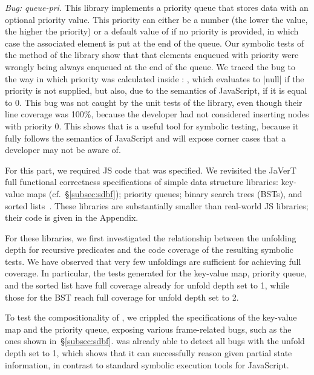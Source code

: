 \vspace*{0.3em}
\noindent \emph{Bug: queue-pri.} This library implements a priority queue that stores data with an optional priority value.
This priority can either be a number (the lower the value, the higher the priority) or a default value of  if no priority is provided, in which case the associated element is put at the end of the queue.
Our symbolic tests of the  method of the library show that that elements enqueued with priority  were wrongly being always enqueued at the end of the queue. We traced the bug to the way in which priority was calculated inside : , which evaluates to \jsinline|null| if the priority is not supplied, but also, due to the semantics of JavaScript, if it is equal to 0. This bug was not caught by the unit tests of the library, even though their line coverage was 100\%, because the developer had not considered inserting nodes with priority 0. This shows that \cosette is a useful tool for symbolic testing, because it fully follows the semantics of JavaScript and will expose corner cases that a developer may not be aware of.

 For this part, we required JS code that was specified. We revisited the JaVerT full functional correctness specifications of simple data structure libraries: key-value maps (cf.~\S\ref{subsec:sdbf}); priority queues; binary search trees (BSTs), and sorted lists~\cite{javert}. These libraries are substantially smaller than real-world JS libraries; their code is given in the Appendix.

For these libraries, we first investigated the relationship between the unfolding depth for recursive predicates and the code coverage of the resulting symbolic tests. We have observed that very few unfoldings are sufficient for achieving full coverage. In particular, the tests generated for the key-value map, priority queue, and the sorted list have full coverage already for unfold depth set to 1, while those for the BST reach full coverage for unfold depth set to 2. 


To test the compositionality of \cosette, we crippled the specifications of the key-value map and the priority queue, exposing various frame-related bugs, such as the ones shown in~\S\ref{subsec:sdbf}. \cosette was already able to detect all bugs with the unfold depth set to 1, which shows that it can successfully reason given partial state information, in contrast to standard symbolic execution tools for JavaScript.

